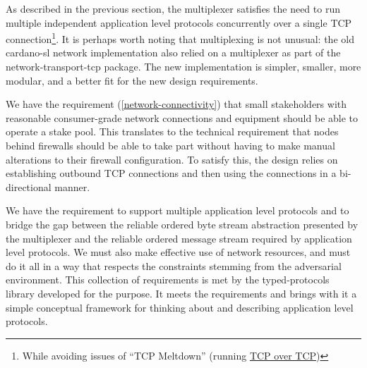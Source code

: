 \documentclass[11pt,a4paper]{article}
\begin{document}
As described in the previous section, the multiplexer satisfies the need
to run multiple independent application level protocols concurrently
over a single TCP connection\footnote{While avoiding issues of ``TCP
  Meltdown'' (running
  \href{https://en.wikipedia.org/wiki/Tunneling_protocol\#Secure_Shell_tunneling}{{TCP
  over TCP}})}. It is perhaps worth noting that multiplexing is not
unusual: the old cardano-sl network implementation also relied on a
multiplexer as part of the network-transport-tcp package. The new
implementation is simpler, smaller, more modular, and a better fit for
the new design requirements.

We have the requirement
(\cref{network-connectivity}) that small
stakeholders with reasonable consumer-grade network connections and
equipment should be able to operate a stake pool. This translates to the
technical requirement that nodes behind firewalls should be able to take
part without having to make manual alterations to their firewall
configuration. To satisfy this, the design relies on establishing
outbound TCP connections and then using the connections in a
bi-directional manner.

We have the requirement to support multiple application level protocols
and to bridge the gap between the reliable ordered byte stream
abstraction presented by the multiplexer and the reliable ordered
message stream required by application level protocols. We must also
make effective use of network resources, and must do it all in a way
that respects the constraints stemming from the adversarial environment.
This collection of requirements is met by the typed-protocols library
developed for the purpose. It meets the requirements and brings with it
a simple conceptual framework for thinking about and describing
application level protocols.
\end{document}
